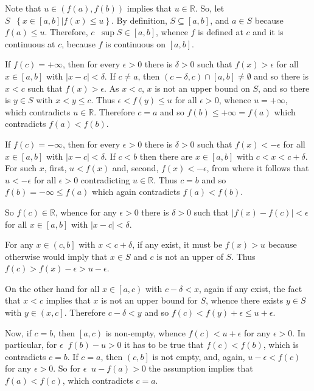 \documentclass[a4paper]{article}
\newcommand{\obj}[1]{\left\{ #1 \right \}}
\newcommand{\clo}[1]{\left [ #1 \right ]}
\newcommand{\clop}[1]{\left [ #1 \right )}
\newcommand{\ploc}[1]{\left ( #1 \right ]}
\newcommand{\brac}[1]{\left ( #1 \right )}
\newcommand{\induc}[1]{\left . #1 \right \vert}
\newcommand{\abs}[1]{\left | #1 \right |}
\newcommand{\Real}{\mathbb{R}}
\newcommand{\defn}{\mathop{\overset{\Delta}{=}}\nolimits}
\begin{document}
Note that $u\in \brac{f\brac{a}, f\brac{b}}$ implies that $u\in \Real$. So, let $S\defn \obj{ \induc{ x\in \clo{a,b} } f\brac{x}\leq u}$. By definition, $S\subseteq \clo{a,b}$, and $a\in S$ because $f\brac{a}\leq u$. Therefore, $c\defn \sup S\in \clo{a,b}$, whence $f$ is defined at $c$ and it is continuous at $c$, because $f$ is continuous on $\clo{a,b}$.

If $f\brac{c} = +\infty$, then for every $\epsilon>0$ there is $\delta>0$ such that $f\brac{x}>\epsilon$ for all $x\in \clo{a,b}$ with $\abs{x-c}<\delta$. If $c\neq a$, then $\brac{c-\delta,c}\cap \clo{a,b}\neq \emptyset$ and so there is $x<c$ such that $f\brac{x}>\epsilon$. As $x<c$, $x$ is not an upper bound on $S$, and so there is $y\in S$ with $x<y\leq c$. Thus $\epsilon<f\brac{y}\leq u$ for all $\epsilon>0$, whence $u=+\infty$, which contradicts $u\in \Real$. Therefore $c=a$ and so $f\brac{b} \leq +\infty = f\brac{a}$ which contradicts $f\brac{a}<f\brac{b}$.

If $f\brac{c}=-\infty$, then for every $\epsilon>0$ there is $\delta>0$ such that $f\brac{x}<-\epsilon$ for all $x\in \clo{a,b}$ with $\abs{x-c}<\delta$. If $c<b$ then there are $x\in \clo{a,b}$ with $c<x<c+\delta$. For such $x$, first, $u<f\brac{x}$ and, second, $f\brac{x}<-\epsilon$, from where it follows that $u<-\epsilon$ for all $\epsilon>0$ contradicting $u\in \Real$. Thus $c=b$ and so $f\brac{b}=-\infty\leq f\brac{a}$ which again contradicts $f\brac{a}<f\brac{b}$.

So $f\brac{c}\in \Real$, whence for any $\epsilon>0$ there is $\delta>0$ such that $\abs{f\brac{x}-f\brac{c}}<\epsilon$ for all $x\in \clo{a,b}$ with $\abs{x-c}<\delta$.

For any $x\in \ploc{c,b}$ with $x<c+\delta$, if any exist, it must be $f\brac{x}>u$ because otherwise would imply that $x\in S$ and $c$ is not an upper of $S$. Thus $f\brac{c}>f\brac{x}-\epsilon>u-\epsilon$.

On the other hand for all $x\in \clop{a,c}$ with $c-\delta<x$, again if any exist, the fact that $x<c$ implies that $x$ is not an upper bound for $S$, whence there exists $y\in S$ with $y\in \ploc{x,c}$. Therefore $c-\delta<y$ and so $f\brac{c}<f\brac{y}+\epsilon\leq u+\epsilon$.

Now, if $c=b$, then $\clop{a,c}$ is non-empty, whence $f\brac{c}<u+\epsilon$ for any $\epsilon>0$. In particular, for $\epsilon \defn f\brac{b}-u>0$ it has to be true that $f\brac{c}<f\brac{b}$, which is contradicts $c=b$. If $c=a$, then $\ploc{c,b}$ is not empty, and, again, $u-\epsilon<f\brac{c}$ for any $\epsilon>0$. So for $\epsilon \defn u-f\brac{a}>0$ the assumption implies that $f\brac{a}<f\brac{c}$, which contradicts $c=a$.
\end{document}
